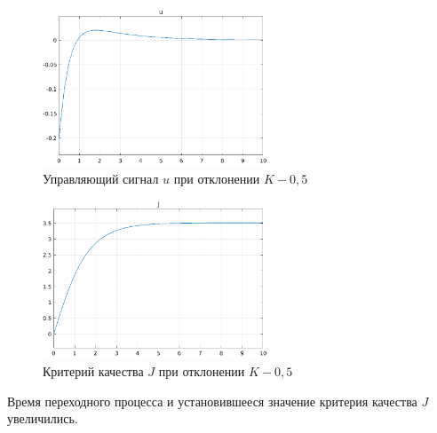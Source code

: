 \documentclass[14pt, a4paper]{extarticle}
\begin{document}
	\begin{figure}[h]
		\centering
		\includegraphics[width=0.6\textwidth]{u-3-minus}
		\caption{Управляющий сигнал $u$ при отклонении $K-0,5$}
		\label{fig:u-3-minus}
	\end{figure}
	
	\begin{figure}[H]
		\centering
		\includegraphics[width=0.6\textwidth]{J-3-minus}
		\caption{Критерий качества $J$ при отклонении $K-0,5$}
		\label{fig:J-3-minus}
	\end{figure}
	
	Время переходного процесса и установившееся значение критерия качества $J$ увеличились.
	
\end{document}
